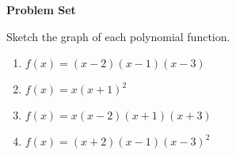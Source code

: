 \textbf{Problem Set}

\vspce

Sketch the graph of each polynomial function. 
\begin{enumerate}[label = \arabic*. ]
\item \hspce $f(x) = (x-2)(x-1)(x-3)$
\item \hspce $f(x) =x(x+1)^2$
\item \hspce $f(x) =x(x-2)(x+1)(x+3)$
\item \hspce $f(x) =(x+2)(x-1)(x-3)^2$
\end{enumerate} 